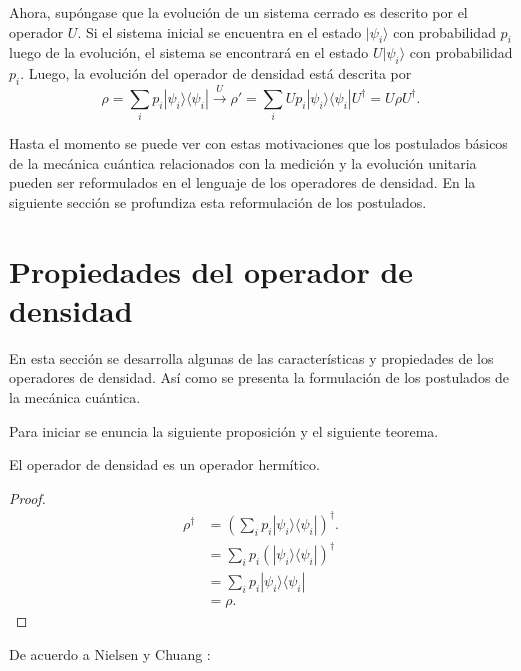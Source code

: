  
 Ahora, supóngase que la evolución de un sistema cerrado es descrito por el operador $U$. Si el sistema inicial se encuentra en el estado $|\psi_i\rangle$ con probabilidad $p_i$ luego de la evolución, el sistema se encontrará en el estado $U|\psi_i\rangle$ con probabilidad $p_i$. Luego, la evolución del operador de densidad está descrita por {\cite{nielsen_chuang_2010}} \[\rho=\sum_{i}p_i|\psi_i\rangle \langle \psi_i|\xrightarrow{U}\rho'=\sum_{i}Up_i|\psi_i\rangle \langle \psi_i|U^{\dagger}=U\rho U^{\dagger}.\]


Hasta el momento se puede ver con estas motivaciones que los postulados básicos de la mecánica cuántica relacionados con la medición y la evolución unitaria pueden ser reformulados en el lenguaje de los operadores de densidad. En la siguiente sección se profundiza esta reformulación de los postulados.


\section{Propiedades del operador de densidad}\label{postulates} %

En esta sección se desarrolla algunas de las características y propiedades de los operadores de densidad. Así como se presenta la formulación de los postulados de la mecánica cuántica. 

Para iniciar se enuncia la siguiente proposición y el siguiente teorema. 

\begin{proposition}El operador de densidad es un operador hermítico.
	
\end{proposition}


\begin{proof}
	\begin{equation}
		\begin{split}
			\rho^\dagger&={\left(\sum_{i} p_i|\psi_i\rangle \langle \psi_i|\right)}^{\dagger}.\\
			&=\sum_{i} p_i {\left(|\psi_i\rangle \langle\psi_i|\right)}^{\dagger}\\
			&=\sum_{i} p_i |\psi_i\rangle \langle\psi_i|\\
			&=\rho.
		\end{split}
	\end{equation}
	
\end{proof}

De acuerdo a Nielsen y Chuang {\cite{nielsen_chuang_2010}}:

